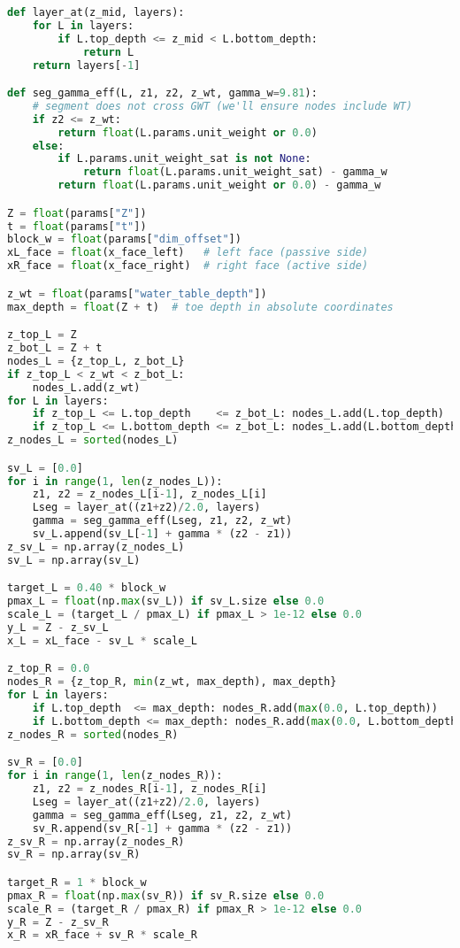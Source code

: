 \begin{lstlisting}[language=Python]
def layer_at(z_mid, layers):
    for L in layers:
        if L.top_depth <= z_mid < L.bottom_depth:
            return L
    return layers[-1]

def seg_gamma_eff(L, z1, z2, z_wt, gamma_w=9.81):
    # segment does not cross GWT (we'll ensure nodes include WT)
    if z2 <= z_wt:
        return float(L.params.unit_weight or 0.0)
    else:
        if L.params.unit_weight_sat is not None:
            return float(L.params.unit_weight_sat) - gamma_w
        return float(L.params.unit_weight or 0.0) - gamma_w

Z = float(params["Z"])
t = float(params["t"])
block_w = float(params["dim_offset"])
xL_face = float(x_face_left)   # left face (passive side)
xR_face = float(x_face_right)  # right face (active side)

z_wt = float(params["water_table_depth"])
max_depth = float(Z + t)  # toe depth in absolute coordinates

z_top_L = Z
z_bot_L = Z + t
nodes_L = {z_top_L, z_bot_L}
if z_top_L < z_wt < z_bot_L:
    nodes_L.add(z_wt)
for L in layers:
    if z_top_L <= L.top_depth    <= z_bot_L: nodes_L.add(L.top_depth)
    if z_top_L <= L.bottom_depth <= z_bot_L: nodes_L.add(L.bottom_depth)
z_nodes_L = sorted(nodes_L)

sv_L = [0.0]
for i in range(1, len(z_nodes_L)):
    z1, z2 = z_nodes_L[i-1], z_nodes_L[i]
    Lseg = layer_at((z1+z2)/2.0, layers)
    gamma = seg_gamma_eff(Lseg, z1, z2, z_wt)
    sv_L.append(sv_L[-1] + gamma * (z2 - z1))
z_sv_L = np.array(z_nodes_L)
sv_L = np.array(sv_L)

target_L = 0.40 * block_w
pmax_L = float(np.max(sv_L)) if sv_L.size else 0.0
scale_L = (target_L / pmax_L) if pmax_L > 1e-12 else 0.0
y_L = Z - z_sv_L
x_L = xL_face - sv_L * scale_L

z_top_R = 0.0
nodes_R = {z_top_R, min(z_wt, max_depth), max_depth}
for L in layers:
    if L.top_depth  <= max_depth: nodes_R.add(max(0.0, L.top_depth))
    if L.bottom_depth <= max_depth: nodes_R.add(max(0.0, L.bottom_depth))
z_nodes_R = sorted(nodes_R)

sv_R = [0.0]
for i in range(1, len(z_nodes_R)):
    z1, z2 = z_nodes_R[i-1], z_nodes_R[i]
    Lseg = layer_at((z1+z2)/2.0, layers)
    gamma = seg_gamma_eff(Lseg, z1, z2, z_wt)
    sv_R.append(sv_R[-1] + gamma * (z2 - z1))
z_sv_R = np.array(z_nodes_R)
sv_R = np.array(sv_R)

target_R = 1 * block_w
pmax_R = float(np.max(sv_R)) if sv_R.size else 0.0
scale_R = (target_R / pmax_R) if pmax_R > 1e-12 else 0.0
y_R = Z - z_sv_R
x_R = xR_face + sv_R * scale_R


\end{lstlisting}
